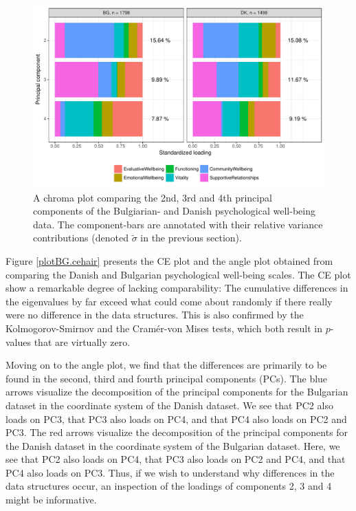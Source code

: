 \documentclass[titlepage,11pt,twoside]{article}
\newcommand{\hl}[1]{\textcolor{magenta}{#1}}
\begin{document}
\begin{figure}
\centerline{\includegraphics[scale = 0.7]{essDKBGpancake234.pdf}}
\caption{A chroma plot comparing the 2nd, 3rd and 4th principal components of the Bulgiarian- and Danish psychological well-being data. The component-bars are annotated with their relative variance contributions (denoted $\tilde\sigma$ in the previous section).}
\label{plotBG.pancake}
\end{figure}




Figure \ref{plotBG.cehair} presents the CE plot and the angle plot obtained from comparing the Danish and Bulgarian psychological well-being scales. The CE plot show a remarkable degree of lacking comparability: The cumulative differences in the eigenvalues by far exceed what could come about randomly if there really were no difference in the data structures. This is also confirmed by the Kolmogorov-Smirnov and the Cram\'er-von Mises tests, which both result in $p$-values that are virtually zero.

Moving on to the angle plot, we find that the differences are primarily to be found in the second, third and fourth principal components (PCs). The blue arrows visualize the decomposition of the principal components for the Bulgarian dataset in the coordinate system of the Danish dataset. We see that PC2 also loads on PC3, that PC3 also loads on PC4, and that PC4 also loads on PC2 and PC3. The red arrows visualize the decomposition of the principal components for the Danish dataset in the coordinate system of the Bulgarian dataset. Here, we see that PC2 also loads on PC4, that PC3 also loads on PC2 and PC4, and that PC4 also loads on PC3. Thus, if we wish to understand why differences in the data structures occur, an inspection of the loadings of components 2, 3 and 4 might be informative.
\end{document}
